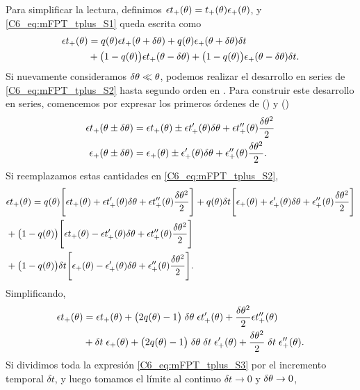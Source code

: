 \documentclass[./main.tex]{subfiles}
\begin{document}
Para simplificar la lectura, definimos  $\epsilon t_+(\theta) =  t_{+}(\theta) \epsilon_{+}(\theta)$, y \ref{C6_eq:mFPT_tplus_S1} queda escrita como
\begin{align}
   \epsilon t_+(\theta) & = q(\theta) \epsilon t_+(\theta + \delta\theta) + q(\theta) \epsilon_{+}(\theta + \delta\theta) \delta t \nonumber \\ & + \big( 1 - q(\theta) \big) \epsilon t_+(\theta - \delta\theta) +  \big( 1 - q(\theta) \big) \epsilon_{+}(\theta - \delta\theta) \delta t.
   \label{C6_eq:mFPT_tplus_S2}
\end{align}
Si nuevamente consideramos $\delta\theta \ll \theta$, podemos realizar el desarrollo en series de \ref{C6_eq:mFPT_tplus_S2} hasta segundo orden en \deltax. Para construir este desarrollo en series, comencemos por expresar los primeros órdenes de \epstplus(\xx) y \epsplus(\xx) 
\begin{align}
    \epsilon t_+(\theta \pm \delta\theta) & = \epsilon t_+(\theta) \pm \epsilon t_+'(\theta) \delta\theta + \epsilon t_+''(\theta) \frac{\delta\theta^2}{2} \\
    \epsilon_{+}(\theta \pm \delta\theta) & = \epsilon_{+}(\theta) \pm \epsilon_{+}'(\theta) \delta\theta + \epsilon_{+}''(\theta) \frac{\delta\theta^2}{2}.
\end{align}
Si reemplazamos estas cantidades en \ref{C6_eq:mFPT_tplus_S2},
\begin{align}
       & \epsilon t_+(\theta) = q(\theta) \Bigg[  \epsilon t_+(\theta) + \epsilon t_+'(\theta) \delta\theta + \epsilon t_+''(\theta) \frac{\delta\theta^2}{2} \Bigg] + q(\theta) \delta t \Bigg[  \epsilon_{+}(\theta) + \epsilon_{+}'(\theta) \delta\theta + \epsilon_{+}''(\theta) \frac{\delta\theta^2}{2}\Bigg] \nonumber \\ & +  \big( 1 - q(\theta) \big) \Bigg[  \epsilon t_+(\theta) - \epsilon t_+'(\theta) \delta\theta + \epsilon t_+''(\theta) \frac{\delta\theta^2}{2} \Bigg] \nonumber \\ & + \big( 1 - q(\theta) \big) \delta t \Bigg[  \epsilon_{+}(\theta) - \epsilon_{+}'(\theta) \delta\theta + \epsilon_{+}''(\theta) \frac{\delta\theta^2}{2}\Bigg] .
\end{align}
Simplificando,
\begin{align}
        \epsilon t_+(\theta) & = \epsilon t_+(\theta) + \big(2 q(\theta) -1 \big) \; \delta\theta \;  \epsilon t_+'(\theta)  +  \frac{\delta\theta^2}{2}  \epsilon t_+''(\theta) \nonumber \\ & + \delta t \; \epsilon_{+}(\theta)  + \big(2 q(\theta) -1 \big) \; \delta\theta \; \delta t \;  \epsilon_{+}'(\theta) +  \frac{\delta\theta^2}{2} \; \delta t \; \epsilon_{+}''(\theta) .
        \label{C6_eq:mFPT_tplus_S3}
\end{align}
Si dividimos toda la expresión \ref{C6_eq:mFPT_tplus_S3} por el incremento temporal $\delta t$, y luego tomamos el límite al continuo  $\delta t \rightarrow   0 $ y $\delta\theta \rightarrow 0$, 
\end{document}
